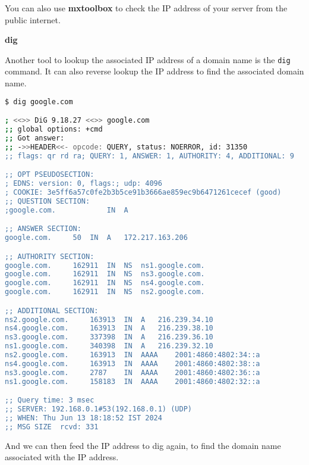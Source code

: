 You can also use \textbf{mxtoolbox} to check the
IP address of your server from the public internet.

\textbf{dig}

Another tool to lookup the associated IP address of
a domain name is the \texttt{dig} command.
It can also reverse lookup the IP address to find
the associated domain name.

\begin{lstlisting}[language=bash]
$ dig google.com

; <<>> DiG 9.18.27 <<>> google.com
;; global options: +cmd
;; Got answer:
;; ->>HEADER<<- opcode: QUERY, status: NOERROR, id: 31350
;; flags: qr rd ra; QUERY: 1, ANSWER: 1, AUTHORITY: 4, ADDITIONAL: 9

;; OPT PSEUDOSECTION:
; EDNS: version: 0, flags:; udp: 4096
; COOKIE: 3e5ff6a57c0fe2b3b5ce91b3666ae859ec9b6471261cecef (good)
;; QUESTION SECTION:
;google.com.			IN	A

;; ANSWER SECTION:
google.com.		50	IN	A	172.217.163.206

;; AUTHORITY SECTION:
google.com.		162911	IN	NS	ns1.google.com.
google.com.		162911	IN	NS	ns3.google.com.
google.com.		162911	IN	NS	ns4.google.com.
google.com.		162911	IN	NS	ns2.google.com.

;; ADDITIONAL SECTION:
ns2.google.com.		163913	IN	A	216.239.34.10
ns4.google.com.		163913	IN	A	216.239.38.10
ns3.google.com.		337398	IN	A	216.239.36.10
ns1.google.com.		340398	IN	A	216.239.32.10
ns2.google.com.		163913	IN	AAAA	2001:4860:4802:34::a
ns4.google.com.		163913	IN	AAAA	2001:4860:4802:38::a
ns3.google.com.		2787	IN	AAAA	2001:4860:4802:36::a
ns1.google.com.		158183	IN	AAAA	2001:4860:4802:32::a

;; Query time: 3 msec
;; SERVER: 192.168.0.1#53(192.168.0.1) (UDP)
;; WHEN: Thu Jun 13 18:18:52 IST 2024
;; MSG SIZE  rcvd: 331
\end{lstlisting}

And we can then feed the IP address to dig again, to find
the domain name associated with the IP address.

